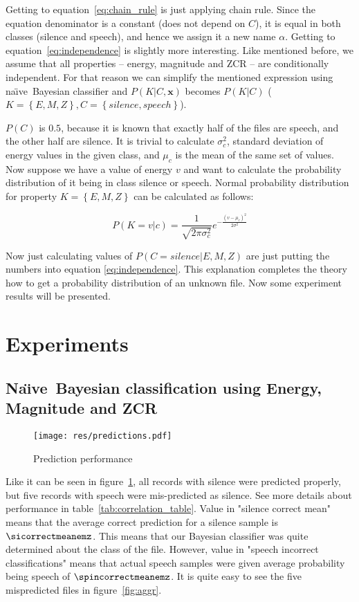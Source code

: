 \documentclass[english,11pt]{article}
\newcommand{\naive}{na\"{\i}ve\ }
\newcommand{\Naive}{Na\"{\i}ve\ }
\numberwithin{equation}{section}
\begin{document}
Getting to equation~\ref{eq:chain_rule} is just applying chain rule. Since the
equation denominator is a constant (does not depend on $C$), it is equal in
both classes (silence and speech), and hence we assign it a new name $\alpha$.
Getting to equation~\ref{eq:independence} is slightly more interesting. Like
mentioned before, we assume that all properties -- energy, magnitude and ZCR --
are conditionally independent. For that reason we can simplify the mentioned
expression using \naive Bayesian classifier and $P(K | C, \mathbf{x})$ becomes
$P(K|C)$ ($K = \left\{E, M, Z\right\}, C = \left\{ silence, speech \right\}$).

$P(C)$ is $0.5$, because it is known that exactly half of the files are speech,
and the other half are silence. It is trivial to calculate $\sigma_{c}^{2}$,
standard deviation of energy values in the given class, and $\mu_{c}$ is the
mean of the same set of values. Now suppose we have a value of energy $v$ and
want to calculate the probability distribution of it being in class silence or
speech. Normal probability distribution for property $K = \left\{E, M,
Z\right\}$ can be calculated as follows:

$$
P(K = v|c) = \frac{1}{\sqrt{2 \pi \sigma_{c}^{2}}}
e ^{- \frac{ (v - \mu_{c})^2 }{2 \sigma^2} }
$$

Now just calculating values of $P(C=silence| E, M, Z)$ are just putting the
numbers into equation \ref{eq:independence}. This explanation completes the
theory how to get a probability distribution of an unknown file. Now some
experiment results will be presented.

\section{Experiments}

\subsection{\Naive Bayesian classification using Energy, Magnitude and ZCR}

\begin{figure}
    \centering
    \texttt{[image: res/predictions.pdf]}
    \caption{Prediction performance}
    \label{fig:simple_performance}
\end{figure}

Like it can be seen in figure~\ref{fig:simple_performance}, all records with
silence were predicted properly, but five records with speech were
mis-predicted as silence. See more details about performance in
table~\ref{tab:correlation_table}. Value in "silence correct mean" means that
the average correct prediction for a silence sample is $\sicorrectmeanemz$. This
means that our Bayesian classifier was quite determined about the class of the
file. However, value in "speech incorrect classifications" means that actual
speech samples were given average probability being speech of
$\spincorrectmeanemz$. It is quite easy to see the five mispredicted files in
figure~\ref{fig:aggr}.
\end{document}
